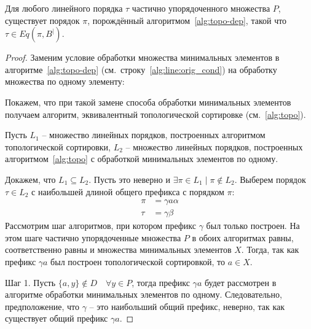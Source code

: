 \begin{theorem}
  Для любого линейного порядка $\tau$ частично упорядоченного
  множества $P$, существует порядок $\pi$, порождённый
  алгоритмом~\ref{alg:topo-dep}, такой что $\tau \in Eq(\pi, B^|)$.
  \label{th:complete-alg-dep}
\end{theorem}
\begin{proof}
  Заменим условие обработки множества минимальных элементов в
  алгоритме~\ref{alg:topo-dep} (см.~строку~\ref{alg:line:orig_cond})
  на обработку множества по одному элементу:
  \begin{algorithm}[H]
    \label{alg:new-cond}
    \begin{algorithmic}[1]
      \setcounter{ALG@line}{8-1}
      \State {} 
      \State {}
      \EndFor
    \end{algorithmic}
  \end{algorithm}
  Покажем, что при такой замене способа обработки минимальных
  элементов получаем алгоритм, эквивалентный топологической
  сортировке (см.~\ref{alg:topo}).

  Пусть $L_1$ -- множество линейных порядков, построенных алгоритмом
  топологической сортировки, $L_2$ -- множество линейных порядков,
  построенных алгоритмом~\ref{alg:topo} с обработкой минимальных
  элементов по одному.

  \noindent
  Докажем, что $L_1 \subseteq L_2$.
  Пусть это неверно и $\exists \pi \in L_1 \mid \pi \notin L_2$.
  Выберем порядок $\tau \in L_2$ с наибольшей длиной общего префикса
  с порядком $\pi$:
  \begin{equation}
    \begin{aligned}
      \pi &= \gamma a \alpha \\
      \tau &= \gamma \beta
    \end{aligned}
    \nonumber
  \end{equation}
  Рассмотрим шаг алгоритмов, при котором префикс $\gamma$ был
  только построен. На этом шаге частично упорядоченные множества $P$
  в обоих алгоритмах равны, соответственно равны и множества
  минимальных элементов $X$. Тогда, так как префикс $\gamma a$ был
  построен топологической сортировкой, то $a \in X$.

  Шаг 1.
  Пусть $\{a, y\} \notin D \quad \forall y \in P$, тогда префикс
  $\gamma a$ будет рассмотрен в алгоритме обработки минимальных
  элементов по одному.
  Следовательно, предположение, что $\gamma$ -- это наибольший общий
  префикс, неверно, так как существует общий префикс $\gamma a$.


\end{proof}
